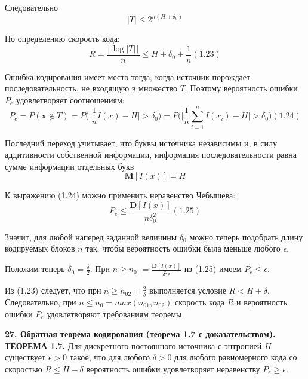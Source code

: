 \documentclass[14pt]{article}
\begin{document}
Следовательно
\begin{displaymath}
    |T| \leq 2^{n(H+\delta_0)}
\end{displaymath}

По определению скорость кода: 
\begin{displaymath}
    R = \frac{\lceil \log |T| \rceil}{n} \leq H + \delta_0 + \frac{1}{n}      (1.23)
\end{displaymath}

Ошибка кодирования имеет место тогда, когда источник порождает последовательность, не входящую в множество \(T\). Поэтому вероятность ошибки \(P_e\) удовлетворяет соотношениям:
\begin{displaymath}
    P_e = P(\textbf{x} \notin T) = P\Big(\Big|\frac{1}{n}I(x) - H \Big| > \delta_0 \Big) = P\Big(\Big|\frac{1}{n}\sum_{i=1}^{n}I(x_i) - H \Big| > \delta_0 \Big)      (1.24)
\end{displaymath}

Последний переход учитывает, что буквы источника независимы и, в силу аддитивности собственной информации, информация последовательности равна сумме информации отдельных букв
\begin{displaymath}
    \textbf{M}[I(x)] = H
\end{displaymath}

К выражению (1.24) можно применить неравенство Чебышева:
\begin{displaymath}
    P_e \leq \frac{\textbf{D}[I(x)]}{n\delta_0^2}    (1.25)
\end{displaymath}

Значит, для любой наперед заданной величины \(\delta_0\) можно теперь подобрать длину кодируемых блоков \(n\) так, чтобы вероятность ошибки была меньше любого \(\epsilon\).

Положим теперь \(\delta_0 = \frac{\delta}{2}\). При \(n \geq n_{01} = \frac{\textbf{D}[I(x)]}{\delta^2 \epsilon}\) из (1.25) имеем \(P_e \leq \epsilon\).

Из (1.23) следует, что при \(n \geq n_{02} = \frac{2}{\delta}\) выполняется условие \(R < H + \delta\). Следовательно, при \(n \leq n_0 = max(n_{01}, n_{02})\) скорость кода \(R\) и вероятность ошибки \(P_e\) удовлетворяют требованиям теоремы.

\bigskip
\textbf{27. Обратная теорема кодирования (теорема 1.7 с доказательством).} \\

\textbf{ТЕОРЕМА 1.7.} Для дискретного постоянного источника с энтропией \(H\) существует \(\epsilon > 0\) такое, что для любого \(\delta > 0\) для любого равномерного кода со скоростью \(R \leq H - \delta\) вероятность ошибки удовлетворяет неравенству \(P_e \geq \epsilon\).
\end{document}
